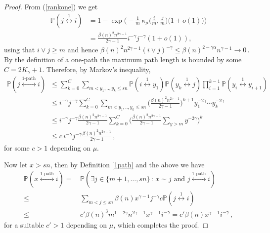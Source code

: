 \documentclass[12pt,a4paper]{article}
\numberwithin{equation}{section}
\begin{document}
\begin{proof}
From (\ref{rankone}) we get
\begin{equation}\label{simpleform}
\begin{aligned}
    \mathbb P(j\overset{1}{\longleftrightarrow}i) & = 1- \exp\Big(- \frac{1}{m}\, \kappa_\mu\Big( \frac{i}{m}, \frac{j}{m}\Big)\big(1+o(1)\big)\Big) \\ &  = \tfrac{\beta(n)^2n^{2\gamma-1}}{2\gamma-1} i^{-\gamma} j^{-\gamma} (1+o(1)),
    \end{aligned}
    \end{equation}
     using that $i \vee j \ge m$ and hence
    $\beta(n)^2n^{2\gamma-1}(i \vee j)^{-\gamma} \le \beta(n)^{2-\gamma\alpha}n^{\gamma-1} 
    \to 0\,.$
By the definition of a one-path the maximum path length is bounded by some~$C=2K_\gamma+1$. Therefore, by Markov’s inequality,
\begin{align*}
     \mathbb P(j\overset{1\text{-path}}{\longleftrightarrow}i) & \le  \sum_{k=0}^C \sum_{m<y_1,..,y_{k}\le sn}\mathbb P(i\overset{1}{\longleftrightarrow}y_1)\mathbb P(y_{k}\overset{1}{\longleftrightarrow}j)\prod_{i=1}^{k-1}\mathbb P(y_i\overset{1}{\longleftrightarrow}y_{i+1})
     \\ & \le   i^{-\gamma} j^{-\gamma}\sum_{k=0}^C \sum_{m<y_1,..,y_{k}\le sn}\Big( \frac{\beta(n)^2n^{2\gamma-1}}{2\gamma-1}\Big)^{k+1} y_1^{-2\gamma}\cdots y_k^{-2\gamma}
     \\ 
     & \le   i^{-\gamma} j^{-\gamma} \frac{\beta(n)^2n^{2\gamma-1}}{2\gamma-1} \sum_{k=0}^C
     \Big( \frac{\beta(n)^2n^{2\gamma-1}}{2\gamma-1} \sum_{y>m} y^{-2\gamma} \Big)^{k}   \\
     & \le    c \, i^{-\gamma} j^{-\gamma} \frac{\beta(n)^2n^{2\gamma-1}}{2\gamma-1} \,,
\end{align*}
for some $c>1$ depending on $\mu$. 
\pagebreak[3]\smallskip

Now let $x>sn$, then by Definition \ref{1path} and the above we have
\begin{align*}
     \mathbb P(x\overset{1\text{-path}}{\longleftrightarrow}i)= &\,\mathbb P(\exists j\in\{m+1,\dots,sn\}\,:\,x\sim j \text{ and }j\overset{1\text{-path}}{\longleftrightarrow}i)
     \\ \le &\, \sum_{m< j \le sn}\beta(n)x^{\gamma-1}j^{-\gamma} c \mathbb P(j\overset{1}{\longleftrightarrow}i)
     \\ \le &\, c' \beta(n)^3 m^{1-2\gamma}n^{2\gamma-1}x^{\gamma-1}i^{-\gamma}=c' \beta(n) x^{\gamma-1}i^{-\gamma}\,,
\end{align*}
for a suitable $c'>1$  depending on $\mu$, which completes the proof.
\end{proof}
\end{document}
